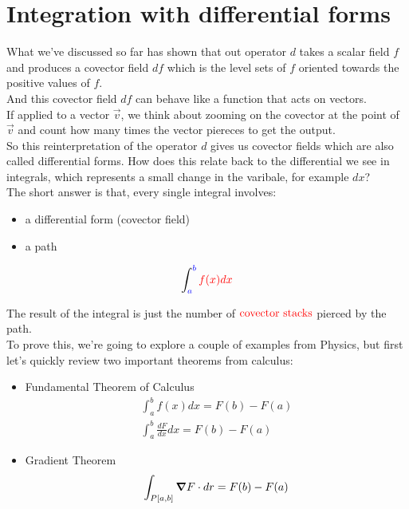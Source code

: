 \section{Integration with differential forms}

What we've discussed so far has shown that out operator $d$ takes a scalar field $f$
and produces a covector field $df$ which is the level sets of $f$ oriented towards the positive
values of $f$.\\
And this covector field $df$ can behave like a function that acts on vectors.\\
If applied to a vector $\vec{v}$, we think about zooming on the covector at the point of $\vec{v}$ and 
count how many times the vector piereces to get the output.\\

So this reinterpretation of the operator $d$ gives us covector fields which are also called differential forms.
How does this relate back to the differential we see in integrals, which represents a small change in the varibale, for 
example $dx$?\\

The short answer is that, every single integral involves:

\begin{itemize}
    \item a \begingroup\color{red}differential form (covector field)\endgroup
    \item a \begingroup\color{blue}path\endgroup
\end{itemize}

\begin{equation}
    \int_{\begingroup\color{blue}a\endgroup}^{\begingroup\color{blue}b\endgroup}
    \begingroup\color{red}f(x)dx\endgroup
\end{equation}

The result of the integral is just the number of $\begingroup\color{red}\text{covector stacks}\endgroup$ pierced by the \begingroup\color{blue}path\endgroup.\\

To prove this, we're going to explore a couple of examples from Physics, but first let's quickly review two important
theorems from calculus:

\begin{itemize}
    \item Fundamental Theorem of Calculus
    \begin{align*}
        \int_a^b f(x)dx = F(b) - F(a)\\
        \int_a^b \frac{dF}{dx}dx = F(b) - F(a)
    \end{align*}
    \item Gradient Theorem
    \begin{align*}
        \int_{P[a,b]} \grad{F} \cdot dr= F(b) - F(a)
    \end{align*}
\end{itemize}

